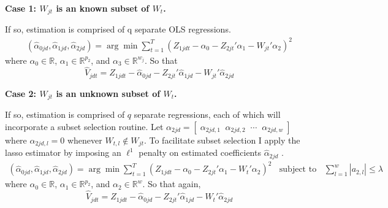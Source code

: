 \documentclass[10pt]{article}
\begin{document}
\noindent \bf Case 1: \rm $W_{jt}$ is an known subset of $W_{t}$.   \

\noindent If so, estimation is comprised of q separate OLS regressions.
\begin{align*} 
(\hat{\alpha}_{0jd}, \hat{\alpha}_{1jd},\hat{\alpha}_{2jd}) 
 = \arg \min \sum_{t=1}^T\left(Z_{1jdt} - \alpha_{0} -  Z_{2jt}'\alpha_{1} - W_{jt}'\alpha_{2} \right)^2
\end{align*}
where $\alpha_0 \in \mathbb{R}$, $\alpha_{1} \in \mathbb{R}^{p_2}$, and $\alpha_{3} \in \mathbb{R}^{w_j}$. So that 
$$\hat{V}_{jdt} = Z_{1jdt} - \hat{\alpha}_{0jd} - Z_{2jt}'\hat{\alpha}_{1jd} - W_{jt}'\hat{\alpha}_{2jd}$$

\noindent\bf Case 2: \rm $W_{jt}$ is an unknown subset of $W_{t}$. \

\noindent If so, estimation is comprised of $q$ separate regressions, each of which will incorporate a subset selection routine. Let $\alpha_{2jd} =  [\;\alpha_{2jd,1} \;\; \alpha_{2jd,2} \;\; \cdots \;\; \alpha_{2jd,w} \; ]$ where $\alpha_{2jd,l} = 0$ whenever $W_{t,l} \notin W_{jt}$. To facilitate subset selection I apply the lasso estimator by imposing an $\ell^1$ penalty on estimated coefficients $\hat{\alpha}_{2jd}$ .
%
\begin{align*} 
(\hat{\alpha}_{0jd}, \hat{\alpha}_{1jd},\hat{\alpha}_{2jd})  = \arg \min \sum_{t=1}^T\left(Z_{1jdt} - \alpha_{0} -  Z_{2jt}'\alpha_{1} - W_{t}'\alpha_{2} \right)^2 \;\; \text{ subject to } \;\; \sum_{l = 1}^w |a_{2,l}| \leq \lambda
\end{align*}
where $\alpha_0 \in \mathbb{R}$, $\alpha_{1} \in \mathbb{R}^{p_2}$, and $\alpha_{2} \in \mathbb{R}^{w}$. So that again,
 $$\hat{V}_{jdt} = Z_{1jdt} -\hat{\alpha}_{0jd} - Z_{2jt}'\hat{\alpha}_{1jd} - W_{t}'\hat{\alpha}_{2jd}$$ 
\end{document}
